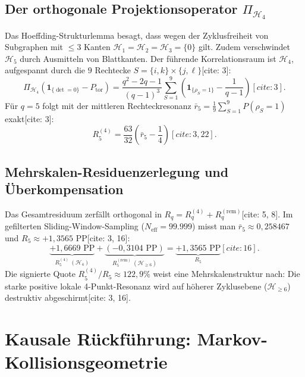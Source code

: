 \documentclass[11pt,a4paper]{article}
\theoremstyle{definition}
\theoremstyle{remark}
\begin{document}
\subsection{Der orthogonale Projektionsoperator $\Pi_{\mathcal{H}_4}$}
Das Hoeffding-Strukturlemma besagt, dass wegen der Zyklusfreiheit von Subgraphen mit $\le 3$ Kanten $\mathcal{H}_1 = \mathcal{H}_2 = \mathcal{H}_3 = \{0\}$ gilt. Zudem verschwindet $\mathcal{H}_5$ durch Ausmitteln von Blattkanten. Der führende Korrelationsraum ist $\mathcal{H}_4$, aufgespannt durch die $9$ Rechtecke $S = \{i, k\} \times \{j, \ell\}$[cite: 3]:
\begin{equation}
\Pi_{\mathcal{H}_4}\left(\mathbf{1}_{\{\det = 0\}} - P_{\mathrm{tor}}\right) = \frac{q^2 - 2q - 1}{(q-1)^3} \sum_{S=1}^9 \left( \mathbf{1}_{\{\rho_S = 1\}} - \frac{1}{q-1} \right)[cite: 3].
\end{equation}
Für $q = 5$ folgt mit der mittleren Rechteckresonanz $\bar{r}_5 = \frac{1}{9}\sum_{S=1}^9 P(\rho_S = 1)$ exakt[cite: 3]:
\begin{equation}
R_5^{(4)} = \frac{63}{32}\left(\bar{r}_5 - \frac{1}{4}\right)[cite: 3, 22].
\end{equation}

\subsection{Mehrskalen-Residuenzerlegung und Überkompensation}
Das Gesamtresiduum zerfällt orthogonal in $R_q = R_q^{(4)} + R_q^{(\mathrm{rem})}$[cite: 5, 8]. Im gefilterten Sliding-Window-Sampling ($N_{\mathrm{eff}} = 99.999$) misst man $\bar{r}_5 \approx 0{,}258467$ und $R_5 \approx +1{,}3565\text{ PP}$[cite: 3, 16]:
\begin{equation}
\underbrace{+1{,}6669\text{ PP}}_{R_5^{(4)} \ (\mathcal{H}_4)} + \underbrace{(-0{,}3104\text{ PP})}_{R_5^{(\mathrm{rem})} \ (\mathcal{H}_{\ge 6})} = \underbrace{+1{,}3565\text{ PP}}_{R_5}[cite: 16].
\end{equation}
Die signierte Quote $R_5^{(4)}/R_5 \approx 122{,}9\%$ weist eine Mehrskalenstruktur nach: Die starke positive lokale 4-Punkt-Resonanz wird auf höherer Zyklusebene ($\mathcal{H}_{\ge 6}$) destruktiv abgeschirmt[cite: 3, 16].

\section{Kausale Rückführung: Markov-Kollisionsgeometrie}
\end{document}
